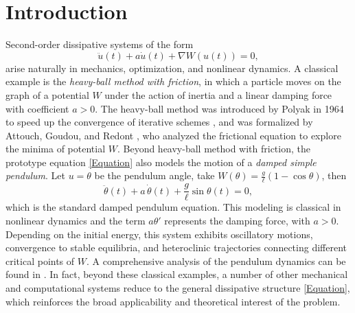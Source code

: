 \documentclass[12pt]{amsart}
\numberwithin{equation}{section}
\begin{document}
	\maketitle
	
	\tableofcontents
	
	\setcounter{tocdepth}{1}
	

\section{Introduction}

Second-order dissipative systems of the form
\begin{equation}\label{Equation}
	\ddot{u}(t) + a \dot{u}(t) + \nabla W(u(t)) = 0,
\end{equation}
arise naturally in mechanics, optimization, and nonlinear dynamics. A classical example is the \emph{heavy-ball method with friction}, in which a particle moves on the graph of a potential $W$ under the action of inertia and a linear damping force with coefficient $a>0$. The heavy-ball method was introduced by Polyak in 1964 to speed up the convergence of iterative schemes \cite{Polyak}, and was formalized by Attouch, Goudou, and Redont \cite{AttouchGoudouRedont}, who analyzed the frictional equation to explore the minima of potential $W$. Beyond heavy-ball method with friction, the prototype equation \eqref{Equation} also models the motion of a \emph{damped simple pendulum}.  
Let $u=\theta$ be the pendulum angle, take $W(\theta)=\frac{g}{\ell}(1-\cos\theta)$, then
$$
\ddot{\theta}(t)+ a\,\dot{\theta}(t)+\dfrac{g}{\ell}\sin\theta(t)=0,
$$
which is the standard damped pendulum equation. This modeling is classical in nonlinear dynamics and the term $a\theta'$ represents the damping force, with $a > 0$. Depending on the initial energy, this system exhibits oscillatory motions, convergence to stable equilibria, and heteroclinic trajectories connecting different critical points of $W$. A comprehensive analysis of the pendulum dynamics can be found in \cite{Mawhin}. In fact, beyond these classical examples, a number of other mechanical and computational systems reduce to the general dissipative structure \eqref{Equation}, which reinforces the broad applicability and theoretical interest of the problem.
\end{document}
